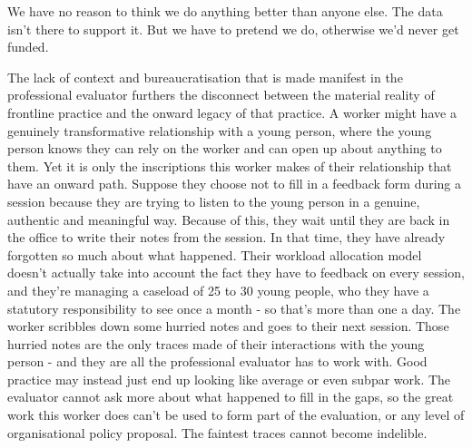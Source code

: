 We have no reason to think we do anything better than anyone else. The data isn't there to support it. But we have to pretend we do, otherwise we'd never get funded.

The lack of context and bureaucratisation that is made manifest in the professional evaluator furthers the disconnect between the material reality of frontline practice and the onward legacy of that practice. A worker might have a genuinely transformative relationship with a young person, where the young person knows they can rely on the worker and can open up about anything to them. Yet it is only the inscriptions this worker makes of their relationship that have an onward path. Suppose they choose not to fill in a feedback form during a session because they are trying to listen to the young person in a genuine, authentic and meaningful way. Because of this, they wait until they are back in the office to write their notes from the session. In that time, they have already forgotten so much about what happened. Their workload allocation model doesn't actually take into account the fact they have to feedback on every session, and they're managing a caseload of 25 to 30 young people, who they have a statutory responsibility to see once a month - so that's more than one a day. The worker scribbles down some hurried notes and goes to their next session. Those hurried notes are the only traces made of their interactions with the young person - and they are all the professional evaluator has to work with. Good practice may instead just end up looking like average or even subpar work. The evaluator cannot ask more about what happened to fill in the gaps, so the great work this worker does can't be used to form part of the evaluation, or any level of organisational policy proposal. The faintest traces cannot become indelible.

